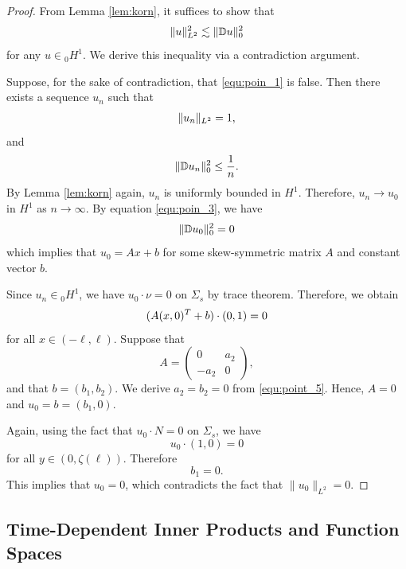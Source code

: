 \documentclass[letterpaper,reqno,10pt,twoside]{amsart}
\theoremstyle{definition}
\theoremstyle{remark}
\begin{document}
	\begin{proof}
		From Lemma \ref{lem:korn}, it suffices to show that
		\begin{align}{\label{equ:poin_1}}
			\|u\|_{L^{2}}^{2}\lesssim \|\mathbb{D}u\|_{0}^{2}
		\end{align}
		for any $u\in {}_0H^{1}$. We derive this inequality via a contradiction argument.
		
		Suppose, for the sake of contradiction, that \eqref{equ:poin_1} is false. Then there exists a sequence $u_{n}$ such that
		\begin{align}{\label{equ:poin_2}}
			\|u_{n}\|_{L^{2}}=1,
		\end{align}
		\noindent and
		\begin{align}{\label{equ:poin_3}}
			\|\mathbb{D}u_{n}\|_{0}^{2}\leq \frac{1}{n}.
		\end{align}
		By Lemma \ref{lem:korn} again, $u_{n}$ is uniformly bounded in $H^{1}$. Therefore, $u_{n}\rightarrow u_{0}$ in $H^{1}$ as $n\rightarrow \infty$. By equation \eqref{equ:poin_3}, we have
		\begin{align}{\label{equ:poin_4}}
			\|\mathbb{D}u_{0}\|_{0}^{2}=0
		\end{align}
		\noindent which implies that $u_{0}=Ax+b$ for some skew-symmetric matrix $A$ and constant vector $b$.
		
		Since $u_{n}\in {}_0H^{1}$, we have $u_{0}\cdot \nu =0$ on $\Sigma_{s}$ by trace theorem. Therefore, we obtain
		\begin{align}{\label{equ:point_5}}
			(A(x,0)^{T}+b)\cdot (0,1)=0
		\end{align}
		\noindent for all $x\in (-\ell,\ell)$. Suppose that 
		\[
		A=
		\begin{pmatrix}
			0 &a_{2}\\
			-a_{2} &0
		\end{pmatrix},
		\]
		and that $b=(b_{1},b_{2})$. We derive $a_{2}=b_{2}=0$ from \eqref{equ:point_5}. Hence, $A=0$ and $u_{0}=b=(b_{1},0)$.
		
		Again, using the fact that $u_{0}\cdot {N}=0$ on $\Sigma_{s}$, we have
		\[
		u_{0}\cdot (1,0)=0
		\]
		\noindent for all $y\in (0,\zeta(\ell))$. Therefore
		\[
		b_{1}=0.
		\]
		This implies that $u_{0}=0$, which contradicts the fact that $\|u_{0}\|_{L^{2}}=0$.
	\end{proof}
	
	
	
	\subsection{Time-Dependent Inner Products and Function Spaces}
	
\end{document}
